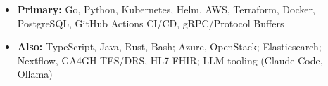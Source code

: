 \begin{itemize}
    \item \textbf{Primary:} Go, Python, Kubernetes, Helm, AWS, Terraform, Docker, PostgreSQL, GitHub Actions CI/CD, gRPC/Protocol Buffers
    \item \textbf{Also:} TypeScript, Java, Rust, Bash; Azure, OpenStack; Elasticsearch; Nextflow, GA4GH TES/DRS, HL7 FHIR; LLM tooling (Claude Code, Ollama)
\end{itemize}
